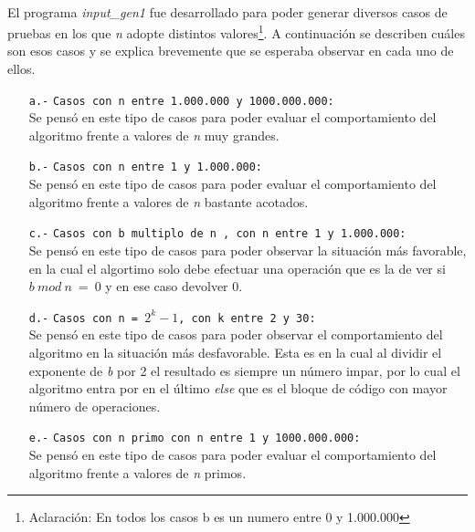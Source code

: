 \paragraph{}
El programa \textit{input\_gen1} fue desarrollado para poder generar diversos casos de pruebas en los que \textit{n} adopte distintos valores\footnote{Aclaración: En todos los casos b es un numero entre 0 y 1.000.000}. A continuación se describen cuáles son esos casos y se explica brevemente que se esperaba observar en cada uno de ellos.
	\begin{itemize}
		\item[\texttt{a.-}]{\texttt{Casos con n entre 1.000.000 y 1000.000.000:} \\
		Se pensó en este tipo de casos para poder evaluar el comportamiento del algoritmo frente a valores de \textit{n} muy grandes.}
		\item[\texttt{b.-}]{\texttt{Casos con n entre 1 y 1.000.000:} \\
		Se pensó en este tipo de casos para poder evaluar el comportamiento del algoritmo frente a valores de \textit{n} bastante acotados.}
		\item[\texttt{c.-}]{\texttt{Casos con b multiplo de n , con n entre 1 y 1.000.000:} \\
		Se pensó en este tipo de casos para poder observar la situación más favorable, en la cual el algortimo solo debe efectuar una operación que es la de ver si $b\ mod\ n\ =\ 0$ y en ese caso devolver 0.}
   		\item[\texttt{d.-}]{\texttt{Casos con n = $2^k - 1$, con k entre 2 y 30:} \\
		Se pensó en este tipo de casos para poder observar el comportamiento del algoritmo en la situación más desfavorable. Esta es en la cual al dividir el exponente de \textit{b} por 2 el resultado es siempre un número impar, por lo cual el algoritmo entra por en el último \textit{else} que es el bloque de código con mayor número de operaciones.} 
		\item[\texttt{e.-}]{\texttt{Casos con n primo con n entre 1 y 1000.000.000:} \\
		Se pensó en este tipo de casos para poder evaluar el comportamiento del algoritmo frente a valores de \textit{n} primos.}
	\end{itemize}  


